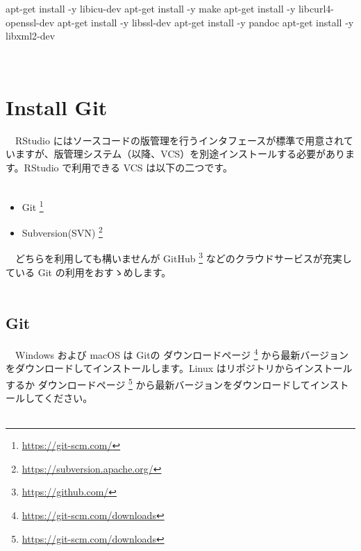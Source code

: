 \documentclass[
  12pt,
]{book}
\newenvironment{Shaded}{\begin{snugshade}}{\end{snugshade}}
\newcommand{\AttributeTok}[1]{\textcolor[rgb]{0.77,0.63,0.00}{#1}}
\newcommand{\ExtensionTok}[1]{#1}
\newcommand{\NormalTok}[1]{#1}
\DeclareRobustCommand{\href}[2]{#2\footnote{\url{#1}}}
\providecommand{\tightlist}{%
  \setlength{\itemsep}{0pt}\setlength{\parskip}{0pt}}
\begin{document}
\begin{Shaded}
\begin{Highlighting}[numbers=left,,]
\ExtensionTok{apt{-}get}\NormalTok{ install }\AttributeTok{{-}y}\NormalTok{ libicu{-}dev}
\ExtensionTok{apt{-}get}\NormalTok{ install }\AttributeTok{{-}y}\NormalTok{ make}
\ExtensionTok{apt{-}get}\NormalTok{ install }\AttributeTok{{-}y}\NormalTok{ libcurl4{-}openssl{-}dev}
\ExtensionTok{apt{-}get}\NormalTok{ install }\AttributeTok{{-}y}\NormalTok{ libssl{-}dev}
\ExtensionTok{apt{-}get}\NormalTok{ install }\AttributeTok{{-}y}\NormalTok{ pandoc}
\ExtensionTok{apt{-}get}\NormalTok{ install }\AttributeTok{{-}y}\NormalTok{ libxml2{-}dev}
\end{Highlighting}
\end{Shaded}

　

\hypertarget{install-git}{%
\section{Install Git}\label{install-git}}

　RStudio にはソースコードの版管理を行うインタフェースが標準で用意されていますが、版管理システム（以降、VCS）を別途インストールする必要があります。RStudio で利用できる VCS は以下の二つです。\\
　

\begin{itemize}
\tightlist
\item
  \href{https://git-scm.com/}{Git }
\item
  \href{https://subversion.apache.org/}{Subversion(SVN) }
\end{itemize}

　どちらを利用しても構いませんが \href{https://github.com/}{GitHub } などのクラウドサービスが充実している Git の利用をおすゝめします。\\
　

\hypertarget{git}{%
\subsection{Git}\label{git}}

　Windows および macOS は Gitの \href{https://git-scm.com/downloads}{ダウンロードページ } から最新バージョンをダウンロードしてインストールします。Linux はリポジトリからインストールするか \href{https://git-scm.com/downloads}{ダウンロードページ } から最新バージョンをダウンロードしてインストールしてください。\\
　
\end{document}
